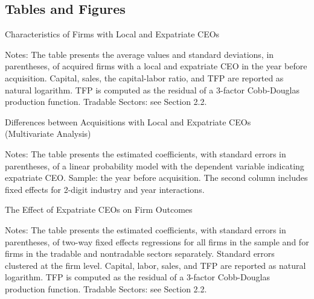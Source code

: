 \documentclass[12pt,a4paper]{article}
\begin{document}
\newpage
\begin{singlespace}
\section*{Tables and Figures}
\vspace{1cm}

\begin{table}[h]
    \centering
    \caption {Characteristics of Firms with Local and Expatriate CEOs}
    \label{tab:desc}   
   
   \begin{minipage}{10cm}
   \vspace{.2cm}
               \footnotesize {Notes: The table presents the average values and standard deviations, in parentheses, of acquired firms with a local and expatriate CEO in the year before acquisition. Capital, sales, the capital-labor ratio, and TFP are reported as natural logarithm. TFP is computed as the residual of a 3-factor Cobb-Douglas production function. Tradable Sectors: see Section 2.2.}    
   \end{minipage}
\end{table}

\clearpage

\begin{table}[h]
    \centering
    \caption{Differences between Acquisitions with Local and Expatriate CEOs \\ (Multivariate Analysis)}
    \label{tab:select}   
   
   \begin{minipage}{10.5cm}
   \vspace{.2cm}
               \footnotesize {Notes: The table presents the estimated coefficients, with standard errors in parentheses, of a linear probability model with the dependent variable indicating expatriate CEO. Sample: the year before acquisition. The second column includes fixed effects for 2-digit industry and year interactions.}    
   \end{minipage}
\end{table}

\clearpage

\begin{table}[]
\centering
    \caption{The Effect of Expatriate CEOs on Firm Outcomes}
    \label{tab:effect_ATET}
  \begin{minipage}{16cm}
  \vspace{.2cm}
  \footnotesize {Notes: The table presents the estimated coefficients, with standard errors in parentheses, of two-way fixed effects regressions for all firms in the sample and for firms in the tradable and nontradable sectors separately. Standard errors clustered at the firm level. Capital, labor, sales, and TFP are reported as natural logarithm. TFP is computed as the residual of a 3-factor Cobb-Douglas production function. Tradable Sectors: see Section 2.2.}
\end{minipage}            
\end{table}



\end{singlespace}
\end{document}
